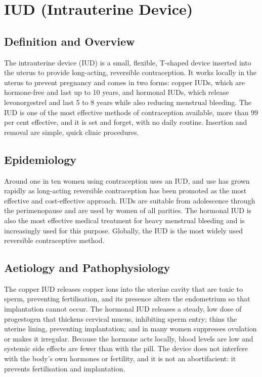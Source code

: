 \chapter{IUD (Intrauterine Device)}

\section*{Definition and Overview}
The intrauterine device (IUD) is a small, flexible, T-shaped device inserted into the uterus to provide long-acting, reversible contraception. It works locally in the uterus to prevent pregnancy and comes in two forms: copper IUDs, which are hormone-free and last up to 10 years, and hormonal IUDs, which release levonorgestrel and last 5 to 8 years while also reducing menstrual bleeding. The IUD is one of the most effective methods of contraception available, more than 99 per cent effective, and it is set and forget, with no daily routine. Insertion and removal are simple, quick clinic procedures.

\section*{Epidemiology}
Around one in ten women using contraception uses an IUD, and use has grown rapidly as long-acting reversible contraception has been promoted as the most effective and cost-effective approach. IUDs are suitable from adolescence through the perimenopause and are used by women of all parities. The hormonal IUD is also the most effective medical treatment for heavy menstrual bleeding and is increasingly used for this purpose. Globally, the IUD is the most widely used reversible contraceptive method.

\section*{Aetiology and Pathophysiology}
The copper IUD releases copper ions into the uterine cavity that are toxic to sperm, preventing fertilisation, and its presence alters the endometrium so that implantation cannot occur. The hormonal IUD releases a steady, low dose of progestogen that thickens cervical mucus, inhibiting sperm entry; thins the uterine lining, preventing implantation; and in many women suppresses ovulation or makes it irregular. Because the hormone acts locally, blood levels are low and systemic side effects are fewer than with the pill. The device does not interfere with the body's own hormones or fertility, and it is not an abortifacient: it prevents fertilisation and implantation.

